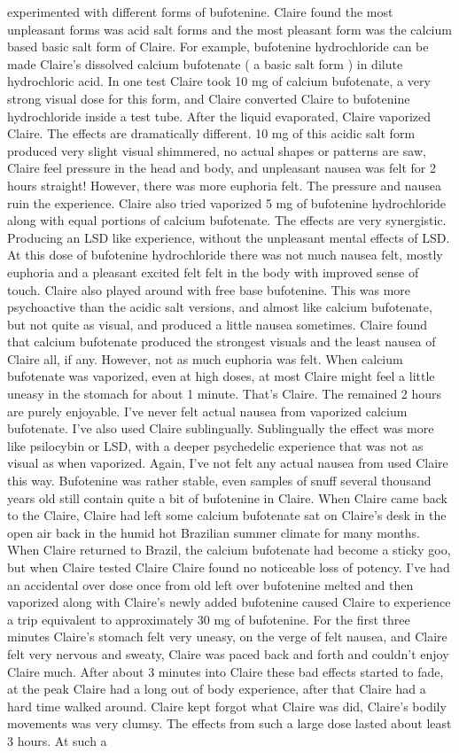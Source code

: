 \documentclass[12pt]{book}
\begin{document}
experimented with different forms of bufotenine. Claire found the most unpleasant forms was acid salt forms and the most pleasant form was the calcium based basic salt form of Claire. For example, bufotenine hydrochloride can be made Claire's dissolved calcium bufotenate ( a basic salt form ) in dilute hydrochloric acid. In one test Claire took 10 mg of calcium bufotenate, a very strong visual dose for this form, and Claire converted Claire to bufotenine hydrochloride inside a test tube. After the liquid evaporated, Claire vaporized Claire. The effects are dramatically different. 10 mg of this acidic salt form produced very slight visual shimmered, no actual shapes or patterns are saw, Claire feel pressure in the head and body, and unpleasant nausea was felt for 2 hours straight! However, there was more euphoria felt. The pressure and nausea ruin the experience. Claire also tried vaporized 5 mg of bufotenine hydrochloride along with equal portions of calcium bufotenate. The effects are very synergistic. Producing an LSD like experience, without the unpleasant mental effects of LSD. At this dose of bufotenine hydrochloride there was not much nausea felt, mostly euphoria and a pleasant excited felt felt in the body with improved sense of touch. Claire also played around with free base bufotenine. This was more psychoactive than the acidic salt versions, and almost like calcium bufotenate, but not quite as visual, and produced a little nausea sometimes. Claire found that calcium bufotenate produced the strongest visuals and the least nausea of Claire all, if any. However, not as much euphoria was felt. When calcium bufotenate was vaporized, even at high doses, at most Claire might feel a little uneasy in the stomach for about 1 minute. That's Claire. The remained 2 hours are purely enjoyable. I've never felt actual nausea from vaporized calcium bufotenate. I've also used Claire sublingually. Sublingually the effect was more like psilocybin or LSD, with a deeper psychedelic experience that was not as visual as when vaporized. Again, I've not felt any actual nausea from used Claire this way. Bufotenine was rather stable, even samples of snuff several thousand years old still contain quite a bit of bufotenine in Claire. When Claire came back to the Claire, Claire had left some calcium bufotenate sat on Claire's desk in the open air back in the humid hot Brazilian summer climate for many months. When Claire returned to Brazil, the calcium bufotenate had become a sticky goo, but when Claire tested Claire Claire found no noticeable loss of potency. I've had an accidental over dose once from old left over bufotenine melted and then vaporized along with Claire's newly added bufotenine caused Claire to experience a trip equivalent to approximately 30 mg of bufotenine. For the first three minutes Claire's stomach felt very uneasy, on the verge of felt nausea, and Claire felt very nervous and sweaty, Claire was paced back and forth and couldn't enjoy Claire much. After about 3 minutes into Claire these bad effects started to fade, at the peak Claire had a long out of body experience, after that Claire had a hard time walked around. Claire kept forgot what Claire was did, Claire's bodily movements was very clumsy. The effects from such a large dose lasted about least 3 hours. At such a 
\end{document}
